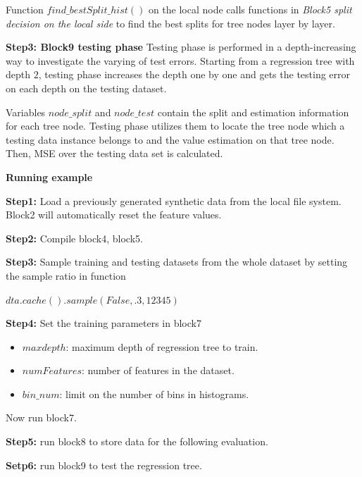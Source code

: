 Function $find\_bestSplit\_hist()$ on the local node calls functions in \textit{Block5 split decision on the local side}
to find the best splits for tree nodes layer by layer. 

\textbf{Step3: Block9 testing phase}
Testing phase is performed in a depth-increasing way to investigate the varying of test errors.
Starting from a regression tree with depth $2$, testing phase increases the depth one by one
and gets the testing error on each depth on the testing dataset.

Variables $node\_split$ and $node\_test$ contain the split and estimation information for each tree node.
Testing phase utilizes them to locate the tree node which a testing data instance belongs to and the value estimation on 
that tree node. Then, MSE over the testing data set is calculated.  


\noindent\textbf{Running example}

\textbf{Step1:} Load a previously generated synthetic data from the local file system. 
Block2 will automatically reset the feature values.

\textbf{Step2:} Compile block4, block5.

\textbf{Step3:} Sample training and testing datasets from the whole dataset
by setting the sample ratio in function 

$dta.cache().sample(False, \mathbf{.3}, 12345)$ 

\textbf{Step4:} Set the training parameters in block7

\begin{itemize}
\item $maxdepth$: maximum depth of regression tree to train.

\item $numFeatures$: number of features in the dataset.

\item $bin\_num$: limit on the number of bins in histograms.
\end{itemize}

Now run block7.

\textbf{Step5:} run block8 to store data for the following evaluation.

\textbf{Setp6:} run block9 to test the regression tree. 

